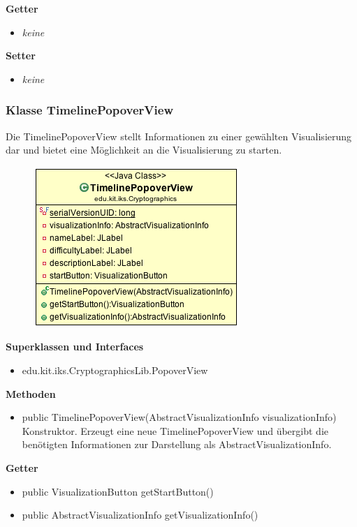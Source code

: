 \documentclass{article}
\begin{document}
      \textbf{Getter}
      \begin{itemize}
        \item \textit{keine}
      \end{itemize}

      \textbf{Setter}
      \begin{itemize}
        \item \textit{keine}
      \end{itemize}

    \subsubsection{Klasse TimelinePopoverView}
      Die TimelinePopoverView stellt Informationen zu einer gewählten Visualisierung dar und bietet eine Möglichkeit an die Visualisierung zu starten.
      \begin{figure}[H]
        \centering
        \includegraphics{resources/edu-kit-iks-Cryptographics-TimelinePopoverView}
      \end{figure}

      \textbf{Superklassen und Interfaces}
      \begin{itemize}
        \item edu.kit.iks.CryptographicsLib.PopoverView
      \end{itemize}
      
      \textbf{Methoden}
      \begin{itemize}
        \item public TimelinePopoverView(AbstractVisualizationInfo visualizationInfo) \newline
        Konstruktor. Erzeugt eine neue TimelinePopoverView und übergibt die benötigten Informationen zur Darstellung als AbstractVisualizationInfo.
      \end{itemize}

      \textbf{Getter}
      \begin{itemize}
        \item public VisualizationButton getStartButton()
        \item public AbstractVisualizationInfo getVisualizationInfo()
      \end{itemize}
\end{document}
